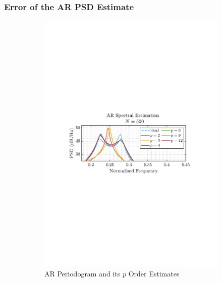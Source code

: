 \documentclass[12pt]{article}
\numberwithin{equation}{section}
\begin{document}
	\subsubsection{Error of the AR PSD Estimate}
	\begin{figure}[H]
		\centering
		\begin{subfigure}{0.49\textwidth}
			\centering
			\includegraphics[trim={2.2cm 11.2cm 3.15cm  11.2cm}, clip, width=\textwidth]{../MATLAB/figures/q1_4b_fig14.pdf} 
			\captionsetup{justification=centering}
			\caption{AR Periodogram and its $p$ Order Estimates}
		\end{subfigure}
		\begin{subfigure}{0.49\textwidth}
			\centering

\end{subfigure}
\end{figure}
\end{document}
